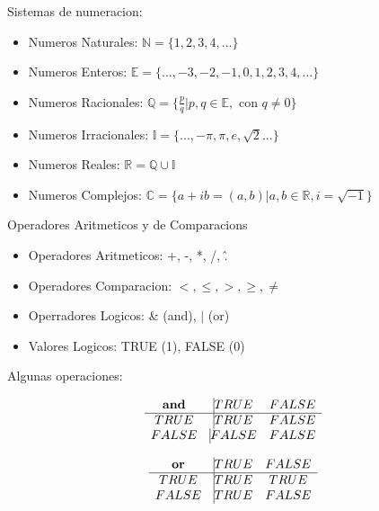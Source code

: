 \begin{frame}
Sistemas de numeracion:

\begin{itemize}
\item Numeros Naturales: $\mathbb{N} = \{1, 2, 3, 4, ...\}$
\item Numeros Enteros: $\mathbb{E} = \{..., -3, -2, -1, 0, 1, 2, 3, 4, ...\}$
\item Numeros Racionales: $\mathbb{Q} = \{ \frac{p}{q} | p,q \in \mathbb{E}, \text{ con } q \neq 0 \}$
\item Numeros Irracionales: $\mathbb{I} = \{ ..., -\pi, \pi, e, \sqrt{2} ... \}$  
\item Numeros Reales: $\mathbb{R} = \mathbb{Q} \cup \mathbb{I} $
\item Numeros Complejos: $\mathbb{C} = \{ a+ ib = (a,b) | a, b \in \mathbb{R}, i=\sqrt{-1} \}$  
\end{itemize}

\end{frame}

\begin{frame}
Operadores Aritmeticos y de Comparacions

\begin{itemize}
\item Operadores Aritmeticos: +, -, *, /, \^.
\item Operadores Comparacion: $ <, \leq, >, \geq, \neq $ 
\item Operradores Logicos: \& (and), $|$ (or)
\item Valores Logicos: TRUE (1), FALSE (0)
\end{itemize}


\end{frame}

\begin{frame}

Algunas operaciones:

$$
\begin{matrix}
\textbf{and} & \vline  TRUE  & FALSE \\
\hline
TRUE & \vline  TRUE &  FALSE \\
FALSE & \vline FALSE & FALSE
\end{matrix}
$$


$$
\begin{matrix}
\textbf{or} & \vline  TRUE  & FALSE \\
\hline
TRUE & \vline  TRUE &  TRUE \\
FALSE & \vline TRUE & FALSE
\end{matrix}
$$


\end{frame}

